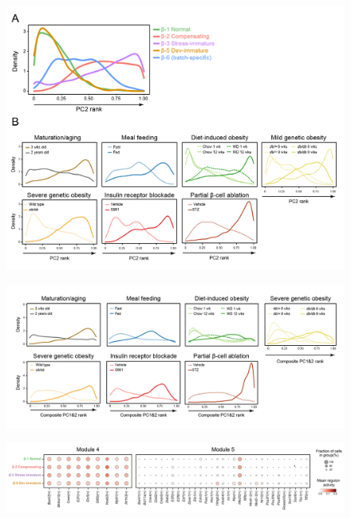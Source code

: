 \begin{figure}[H]
\centering
\includegraphics[width=\linewidth]{Appendix2/Fig/F3-7-03.png}
\caption[Increased β-cell workload across studies along PC2]{}
\label{suppl_fig:chp3_pc2}
\end{figure}

\begin{figure}[H]
\centering
\includegraphics[width=\linewidth]{Appendix2/Fig/F3-7-01.png}
\caption[β-cell failure across studies along composite PC1 and PC2]{}
\label{suppl_fig:chp3_pc2}
\end{figure}

\begin{figure}[H]
\centering
\includegraphics[width=\linewidth]{Appendix2/Fig/F3-12-04.png}
\caption[Mean regulon activity of all regulons in Module-4 and Module-5 of β-cell GRN]{}
\label{suppl_fig:chp3_GRNmods45}
\end{figure}

